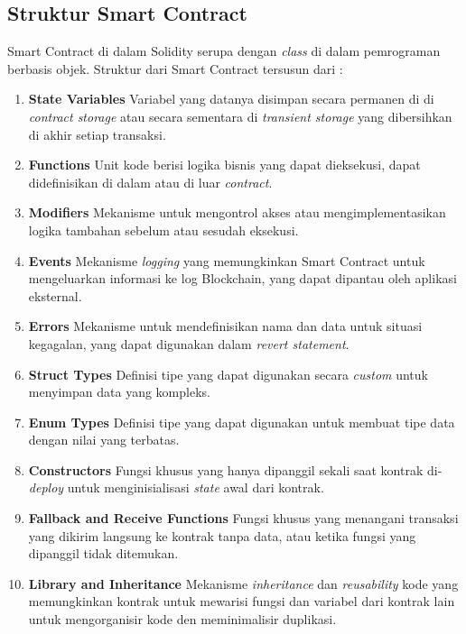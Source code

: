 \subsection{Struktur Smart Contract}
\label{subsec:struktur-smart-contract}

Smart Contract di dalam Solidity serupa dengan \textit{class} di dalam pemrograman berbasis objek. Struktur dari Smart Contract tersusun dari \parencite{solidity_structure}:

\begin{enumerate}
	\item \textbf{State Variables} \newline
	      Variabel yang datanya disimpan secara permanen di di \textit{contract storage} atau secara sementara di \textit{transient storage} yang dibersihkan di akhir setiap transaksi.
	\item \textbf{Functions} \newline
	      Unit kode berisi logika bisnis yang dapat dieksekusi, dapat didefinisikan di dalam atau di luar \textit{contract}.
	\item \textbf{Modifiers} \newline
	      Mekanisme untuk mengontrol akses atau mengimplementasikan logika tambahan sebelum atau sesudah eksekusi.
	\item \textbf{Events} \newline
	      Mekanisme \textit{logging} yang memungkinkan Smart Contract untuk mengeluarkan informasi ke log Blockchain, yang dapat dipantau oleh aplikasi eksternal.
	\item \textbf{Errors} \newline
	      Mekanisme untuk mendefinisikan nama dan data untuk situasi kegagalan, yang dapat digunakan dalam \textit{revert statement}.
	\item \textbf{Struct Types} \newline
	      Definisi tipe yang dapat digunakan secara \textit{custom} untuk menyimpan data yang kompleks.
	\item \textbf{Enum Types} \newline
	      Definisi tipe yang dapat digunakan untuk membuat tipe data dengan nilai yang terbatas.
	\item \textbf{Constructors} \newline
	      Fungsi khusus yang hanya dipanggil sekali saat kontrak di-\textit{deploy} untuk menginisialisasi \textit{state} awal dari kontrak.
	\item \textbf{Fallback and Receive Functions} \newline
	      Fungsi khusus yang menangani transaksi yang dikirim langsung ke kontrak tanpa data, atau ketika fungsi yang dipanggil tidak ditemukan.
	\item \textbf{Library and Inheritance} \newline
	      Mekanisme \textit{inheritance} dan \textit{reusability} kode yang memungkinkan kontrak untuk mewarisi fungsi dan variabel dari kontrak lain untuk mengorganisir kode den meminimalisir duplikasi.
\end{enumerate}
